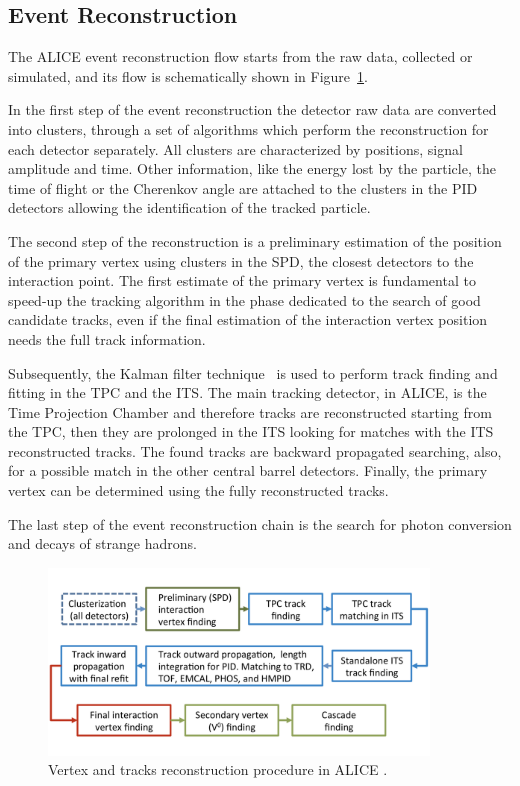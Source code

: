 %
\subsection{Event Reconstruction} \label{sec:event_rec}

The ALICE event reconstruction flow starts from the raw data, collected or simulated, and its flow is 
schematically shown in Figure~\ref{fig:rec_flow}. 

In the first step of the event reconstruction the detector raw data are converted into clusters, 
through a set of algorithms which perform the reconstruction for each detector separately.
All clusters are characterized by positions, signal amplitude and time.
Other information, like the energy lost by the particle, the time of flight or the Cherenkov 
angle are attached to the clusters in the PID detectors allowing the identification of the 
tracked particle.

The second step of the reconstruction is a preliminary estimation of the position of the primary
vertex using clusters in the SPD, the closest detectors to the interaction point.
The first estimate of the primary vertex is fundamental to speed-up the tracking algorithm in the 
phase dedicated to the search of good candidate tracks, even if the final estimation of the 
interaction vertex position needs the full track information.

Subsequently, the Kalman filter technique~\cite{kalman} is used to perform track finding and
fitting in the TPC and the ITS. 
The main tracking detector, in ALICE, is the Time Projection Chamber and therefore tracks are 
reconstructed  starting from the TPC, then they are prolonged in the ITS looking for matches with
the ITS reconstructed tracks. 
The found tracks are backward propagated searching, also, for a possible match in the other central
barrel detectors.
Finally, the primary vertex can be determined using the fully reconstructed tracks.

The last step of the event reconstruction chain is the search for photon conversion and decays of
strange hadrons.

\begin{figure}
    \captionsetup{justification=centering}
    \centering
    \includegraphics[width=0.9\textwidth]{gfx/reconstruction}
	\caption{Vertex and tracks reconstruction procedure in ALICE \cite{alice:Perf2014}.}
	\label{fig:rec_flow}
\end{figure}

